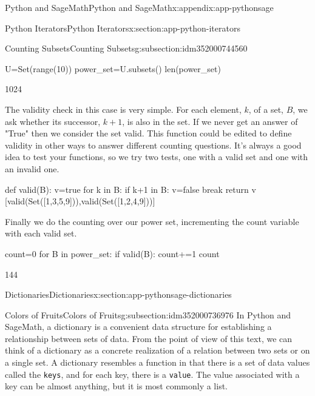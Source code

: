 \documentclass[oneside,10pt,]{book}
\newcommand{\mono}[1]{\texttt{#1}}
\begin{document}
\begin{appendixptx}{Python and SageMath}{}{Python and SageMath}{}{}{x:appendix:app-pythonsage}
\begin{sectionptx}{Python Iterators}{}{Python Iterators}{}{}{x:section:app-python-iterators}
\begin{subsectionptx}{Counting Subsets}{}{Counting Subsets}{}{}{g:subsection:idm352000744560}
\begin{sageinput}
U=Set(range(10))
power_set=U.subsets()
len(power_set)
\end{sageinput}
\begin{sageoutput}
1024
\end{sageoutput}
The validity check in this case is very simple.  For each element, \(k\), of a set, \(B\), we ask whether its successor, \(k+1\), is also in the set.  If we never get an answer of "True" then we consider the set valid.  This function could be edited to define validity in other ways to answer different counting questions.  It's always a good idea to test your functions, so we try two tests, one with a valid set and one with an invalid one.%
\begin{sageinput}
def valid(B):
    v=true
    for k in B:
        if k+1 in B:
            v=false
            break
    return v
[valid(Set([1,3,5,9])),valid(Set([1,2,4,9]))]
\end{sageinput}
\begin{sageoutput}
\end{sageoutput}
Finally we do the counting over our power set, incrementing the count variable with each valid set.%
\begin{sageinput}
count=0
for B in power_set:
    if valid(B):
        count+=1
count
\end{sageinput}
\begin{sageoutput}
144
\end{sageoutput}
\end{subsectionptx}
\end{sectionptx}
%
%
\typeout{************************************************}
\typeout{************************************************}
%
\begin{sectionptx}{Dictionaries}{}{Dictionaries}{}{}{x:section:app-pythonsage-dictionaries}
%
%
\typeout{************************************************}
\typeout{************************************************}
%
\begin{subsectionptx}{Colors of Fruits}{}{Colors of Fruits}{}{}{g:subsection:idm352000736976}
In Python and SageMath, a dictionary is a convenient data structure for establishing a relationship between sets of data.  From the point of view of this text, we can think of a dictionary as a concrete realization of a relation between two sets or on a single set.  A dictionary resembles a function in that there is a set of data values called the \mono{keys}, and for each key, there is a \mono{value}.  The value associated with a key can be almost anything, but it is most commonly a list.%

\end{subsectionptx}
\end{sectionptx}
\end{appendixptx}
\end{document}
